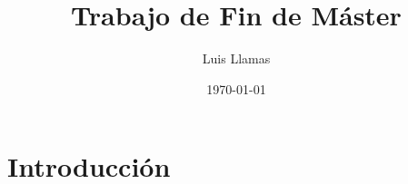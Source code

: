 \documentclass{book}
\title{Trabajo de Fin de Máster}
\author{Luis Llamas}
\date{\today}
\begin{document}
\maketitle

\chapter{Introducción}
\end{document}
